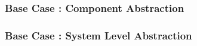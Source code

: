 

\begin{frame}[ctb!]
  \frametitle{Base Case : Component Abstraction}
  
\end{frame}


\begin{frame}[ctb!]
  \frametitle{Base Case : System Level Abstraction}
  
\end{frame}
